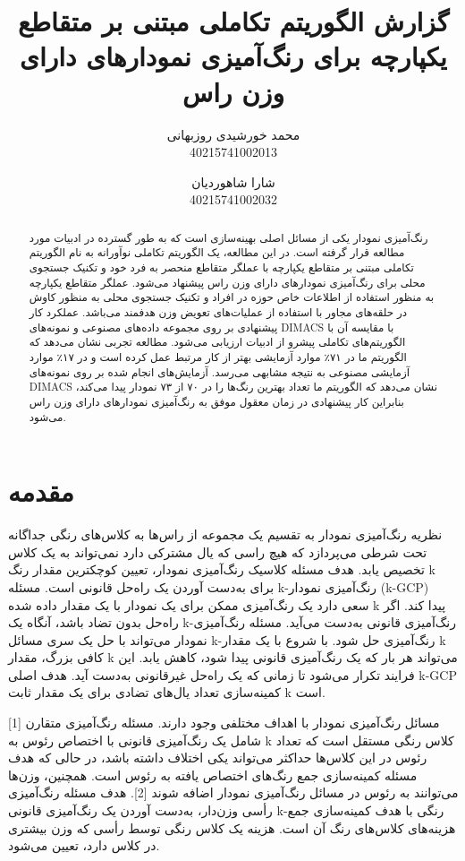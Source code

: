 \documentclass[a4paper,10pt]{article}
\title{گزارش الگوریتم تکاملی مبتنی بر متقاطع یکپارچه برای رنگ‌آمیزی نمودارهای دارای وزن راس}
\author{محمد خورشیدی روزبهانی\\40215741002013 \and شارا شاهوردیان\\40215741002032}
\date{}
\begin{document}
    \maketitle
    
    \vspace{0.5cm}

    \begin{abstract}

        رنگ‌آمیزی نمودار یکی از مسائل اصلی بهینه‌سازی است که به طور گسترده در ادبیات مورد مطالعه قرار گرفته است. در این مطالعه، یک الگوریتم تکاملی نوآورانه به نام الگوریتم تکاملی مبتنی بر متقاطع یکپارچه با عملگر متقاطع منحصر به فرد خود و تکنیک جستجوی محلی برای رنگ‌آمیزی نمودارهای دارای وزن راس پیشنهاد می‌شود. عملگر متقاطع یکپارچه به منظور استفاده از اطلاعات خاص حوزه در افراد و تکنیک جستجوی محلی به منظور کاوش در حلقه‌های مجاور با استفاده از عملیات‌های تعویض وزن هدفمند می‌باشد. عملکرد کار پیشنهادی بر روی مجموعه داده‌های مصنوعی و نمونه‌های DIMACS با مقایسه آن با الگوریتم‌های تکاملی پیشرو از ادبیات ارزیابی می‌شود. مطالعه تجربی نشان می‌دهد که الگوریتم ما در ۷۱٪ موارد آزمایشی بهتر از کار مرتبط عمل کرده است و در ۱۷٪ موارد آزمایشی مصنوعی به نتیجه مشابهی می‌رسد. آزمایش‌های انجام شده بر روی نمونه‌های DIMACS نشان می‌دهد که الگوریتم ما تعداد بهترین رنگ‌ها را در ۷۰ از ۷۳ نمودار پیدا می‌کند، بنابراین کار پیشنهادی در زمان معقول موفق به رنگ‌آمیزی نمودارهای دارای وزن راس می‌شود.
    
    \end{abstract}

    \section{مقدمه}

        نظریه رنگ‌آمیزی نمودار به تقسیم یک مجموعه از راس‌ها به کلاس‌های رنگی جداگانه تحت شرطی می‌پردازد که هیچ راسی که یال مشترکی دارد نمی‌تواند به یک کلاس تخصیص یابد. هدف مسئله کلاسیک رنگ‌آمیزی نمودار، تعیین کوچکترین مقدار رنگ k برای به‌دست آوردن یک راه‌حل قانونی است. مسئله k-رنگ‌آمیزی نمودار (k-GCP) سعی دارد یک رنگ‌آمیزی ممکن برای یک نمودار با یک مقدار داده شده k پیدا کند. اگر راه‌حل بدون تضاد باشد، آنگاه یک k-رنگ‌آمیزی قانونی به‌دست می‌آید. مسئله رنگ‌آمیزی نمودار می‌تواند با حل یک سری مسائل k-رنگ‌آمیزی حل شود. با شروع با یک مقدار k کافی بزرگ، مقدار k می‌تواند هر بار که یک رنگ‌آمیزی قانونی پیدا شود، کاهش یابد. این فرایند تکرار می‌شود تا زمانی که یک راه‌حل غیرقانونی به‌دست آید. هدف اصلی k-GCP کمینه‌سازی تعداد یال‌های تضادی برای یک مقدار ثابت k است.

        مسائل رنگ‌آمیزی نمودار با اهداف مختلفی وجود دارند. مسئله رنگ‌آمیزی متقارن [1] شامل یک رنگ‌آمیزی قانونی با اختصاص رئوس به k کلاس رنگی مستقل است که تعداد رئوس در این کلاس‌ها حداکثر می‌تواند یکی اختلاف داشته باشد، در حالی که هدف مسئله کمینه‌سازی جمع رنگ‌های اختصاص یافته به رئوس است. همچنین، وزن‌ها می‌توانند به رئوس در مسائل رنگ‌آمیزی نمودار اضافه شوند [2]. هدف مسئله رنگ‌آمیزی رأسی وزن‌دار، به‌دست آوردن یک رنگ‌آمیزی قانونی k-رنگی با هدف کمینه‌سازی جمع هزینه‌های کلاس‌های رنگ آن است. هزینه یک کلاس رنگی توسط رأسی که وزن بیشتری در کلاس دارد، تعیین می‌شود.
\end{document}
